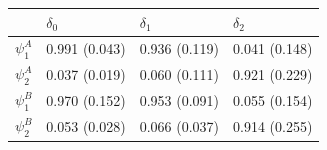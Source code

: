 \begin{tabular}{llll}
\toprule
 & $\delta_0$ & $\delta_1$ & $\delta_2$ \\
\midrule
$\psi_1^A$ & 0.991 (0.043) & 0.936 (0.119) & 0.041 (0.148) \\
$\psi_2^A$ & 0.037 (0.019) & 0.060 (0.111) & 0.921 (0.229) \\
$\psi_1^B$ & 0.970 (0.152) & 0.953 (0.091) & 0.055 (0.154) \\
$\psi_2^B$ & 0.053 (0.028) & 0.066 (0.037) & 0.914 (0.255) \\
\bottomrule
\end{tabular}
